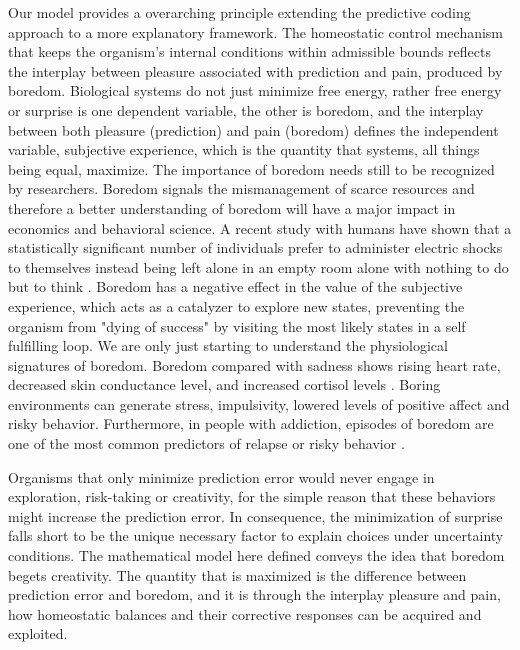 \documentclass[11pt, onecolumn]{article}
\newcommand{\myreferences}{C:/workspace/github/bibliography-jgr/bibliojgr}
\begin{document}
Our model provides a overarching principle extending the predictive coding approach  to a more explanatory framework. The homeostatic control mechanism that keeps the organism's internal conditions within admissible bounds reflects the interplay between pleasure associated with prediction and pain, produced by boredom.
Biological systems do not just minimize free energy, rather free energy or surprise is one dependent variable, the other is boredom, and the interplay between both pleasure (prediction) and pain (boredom) defines the independent variable, subjective experience, which is the quantity that systems, all things being equal, maximize. 
The importance of boredom needs still to be recognized by researchers. Boredom signals the mismanagement of scarce resources and therefore a better  understanding of boredom will have a major impact in economics and behavioral science. A recent study with humans have shown that a statistically significant number of individuals prefer to administer electric shocks to themselves instead being left alone in an empty room alone with nothing to do but to think \citep{wilson_just_2014}. Boredom has a negative effect in the value of the subjective experience, which acts as a catalyzer to explore new states, preventing the organism from "dying of success" by visiting the most likely states  in a self fulfilling loop. We are only just starting to understand the physiological signatures of boredom. Boredom compared with sadness shows rising heart rate, decreased skin conductance level, and increased cortisol levels \citep{merrifield_characterizing_2014}. Boring environments can generate stress, impulsivity, lowered levels of positive affect and risky behavior. Furthermore, in people with addiction, episodes of  boredom are one of the most common predictors of relapse or risky behavior \citep{blaszczynski_boredom_1990}.


Organisms that only minimize prediction error would never engage in exploration, risk-taking or creativity, for the simple reason that these behaviors might increase the prediction error. 
In consequence, the minimization of surprise falls short to be the unique necessary factor to explain choices under uncertainty conditions. The mathematical model here defined conveys the idea that boredom begets creativity. The quantity that is maximized is the difference between prediction error and boredom, and it is  through the interplay pleasure and pain, how homeostatic balances and their corrective responses can be acquired and exploited.


%



\end{document}
